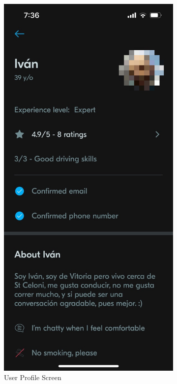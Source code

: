 \documentclass[a4paper, 12pt]{article} %
\begin{document}
\begin{figure}
\begin{subfigure}{0.3\textwidth}
                        \includegraphics[width=0.8\linewidth, height=0.9\textheight, keepaspectratio]{Images/Blablacar_userprofile.png}
                        \caption{User Profile Screen}
                        \label{fig:blabla_profile}
                    \end{subfigure}
                    \begin{subfigure}{0.3\textwidth}

\end{subfigure}
\end{figure}
\end{document}
